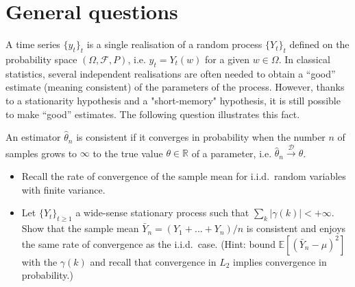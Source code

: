 \documentclass[11pt]{article}
\begin{document}
\section{General questions}

A time series $\{y_t\}_t$ is a single realisation of a random process $\{Y_t\}_t$ defined on the probability space $(\Omega, \mathcal{F}, P)$, i.e. $y_t = Y_t(w)$ for a given $w\in\Omega$.
In classical statistics, several independent realisations are often needed to obtain a ``good'' estimate (meaning consistent) of the parameters of the process.
However, thanks to a stationarity hypothesis and a "short-memory" hypothesis, it is still possible to make ``good'' estimates.
The following question illustrates this fact.

\begin{exercise}
An estimator $\hat{\theta}_n$ is consistent if it converges in probability when the number $n$ of samples grows to $\infty$ to the true value $\theta\in\mathbb{R}$ of a parameter, i.e. $\hat{\theta}_n \xrightarrow{\mathcal{D}} \theta$.

\begin{itemize}
    \item Recall the rate of convergence of the sample mean for i.i.d.\ random variables with finite variance.
    \item Let $\{Y_t\}_{t\geq 1}$ a wide-sense stationary process such that $\sum_k |\gamma (k)| < +\infty$.
    Show that the sample mean $\bar{Y}_n = (Y_1+\dots+Y_n)/n$ is consistent and enjoys the same rate of convergence as the i.i.d.\ case. (Hint: bound $\mathbb{E}[(\bar{Y}_n-\mu)^2]$ with the $\gamma (k)$ and recall that convergence in $L_2$ implies convergence in probability.)
\end{itemize}

\end{exercise}
\end{document}
